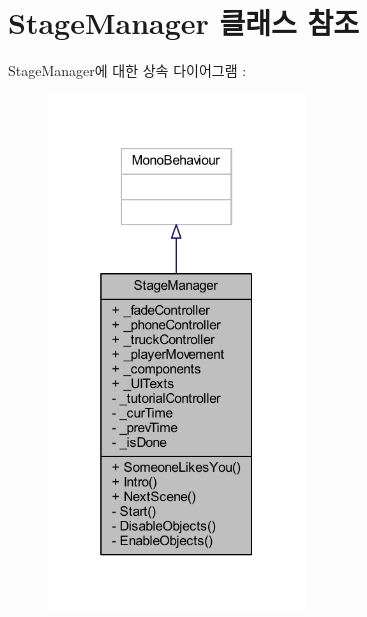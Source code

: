 \hypertarget{class_stage_manager}{}\section{Stage\+Manager 클래스 참조}
\label{class_stage_manager}


Stage\+Manager에 대한 상속 다이어그램 \+: \nopagebreak
\begin{figure}[H]
\begin{center}
\leavevmode
\includegraphics[width=193pt]{d7/dcd/class_stage_manager__inherit__graph}
\end{center}
\end{figure}


